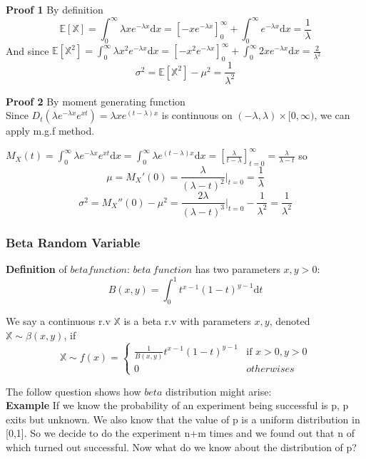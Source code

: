 \documentclass[a4paper,12pt]{article}
\begin{document}
\textbf{Proof 1} By definition\\
$$\mathbb{E}[\mathbb{X}] = \int_0^\infty \lambda x e^{-\lambda x} \mathrm{d}x = [-xe^{-\lambda x}]_0^\infty + \int_0^\infty e^{-\lambda x} \mathrm{d}x = \frac{1}{\lambda}$$
And since $\mathbb{E}[\mathbb{X}^2] = \int_0^\infty \lambda x^2 e^{-\lambda x} \mathrm{d}x = [-x^2e^{-\lambda x}]_0^\infty + \int_0^\infty 2xe^{-\lambda x} \mathrm{d}x = \frac{2}{\lambda^2}$
$$\sigma^2 = \mathbb{E}[\mathbb{X}^2] - \mu^2 = \frac{1}{\lambda^2}$$


\textbf{Proof 2} By moment generating function\\
Since $D_t (\lambda e^{-\lambda x} e^{xt}) = \lambda x e^{(t-\lambda) x}$ is continuous on $(-\lambda, \lambda ) \times [0, \infty)$, we can apply m.g.f method.

$M_X(t) = \int_0^\infty \lambda e^{-\lambda x} e^{xt} \mathrm{d}x = \int_0^\infty \lambda e^{(t-\lambda) x} \mathrm{d}x = [\frac{\lambda}{t-\lambda}]_{t = 0}^\infty = \frac{\lambda}{\lambda - t}$ so
$$\mu = M_X'(0) = \frac{\lambda}{(\lambda - t)^2} |_{t=0} = \frac{1}{\lambda}$$
$$\sigma^2 = M_X''(0) - \mu^2 = \frac{2\lambda}{(\lambda - t)^3} |_{t=0} - \frac{1}{\lambda^2} = \frac{1}{\lambda^2}$$


\subsubsection{Beta Random Variable}
\textbf{Definition} of $beta function$: $beta\ function$ has two parameters $x, y>0$:
$$B(x, y) = \int_0^1 t^{x-1}(1-t)^{y-1}\mathrm{d}t$$ 

We say a continuous r.v $\mathbb{X}$ is a beta r.v with parameters $x, y$, denoted $\mathbb{X} \sim \beta(x, y)$, if
$$
 \mathbb{X} \sim f(x) =
  \begin{cases}
   \frac{1}{B(x, y)} t^{x-1} (1-t)^{y-1} & \text{if } x > 0, y>0 \\
   0       & otherwises
  \end{cases}
$$

The follow question shows how $beta$ distribution might arise:\\

\textbf{Example} If we know the probability of an experiment being successful is p, p exits but unknown. We also know that the value of p is a uniform distribution in [0,1]. So we decide to do the experiment n+m times and we found out that n of which turned out successful. Now what do we know about the distribution of p?\\
\end{document}
